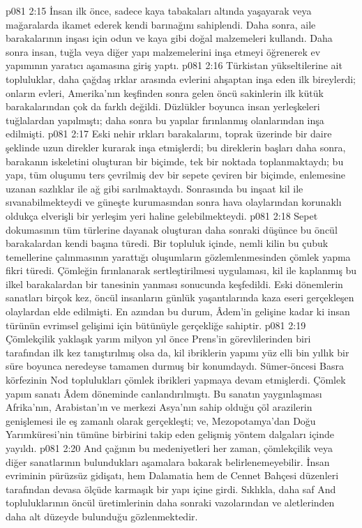 \vs p081 2:15 İnsan ilk önce, sadece kaya tabakaları altında yaşayarak veya mağaralarda ikamet ederek kendi barınağını sahiplendi. Daha sonra, aile barakalarının inşası için odun ve kaya gibi doğal malzemeleri kullandı. Daha sonra insan, tuğla veya diğer yapı malzemelerini inşa etmeyi öğrenerek ev yapımının yaratıcı aşamasına giriş yaptı.
\vs p081 2:16 Türkistan yükseltilerine ait topluluklar, daha çağdaş ırklar arasında evlerini ahşaptan inşa eden ilk bireylerdi; onların evleri, Amerika’nın keşfinden sonra gelen öncü sakinlerin ilk kütük barakalarından çok da farklı değildi. Düzlükler boyunca insan yerleşkeleri tuğlalardan yapılmıştı; daha sonra bu yapılar fırınlanmış olanlarından inşa edilmişti.
\vs p081 2:17 Eski nehir ırkları barakalarını, toprak üzerinde bir daire şeklinde uzun direkler kurarak inşa etmişlerdi; bu direklerin başları daha sonra, barakanın iskeletini oluşturan bir biçimde, tek bir noktada toplanmaktaydı; bu yapı, tüm oluşumu ters çevrilmiş dev bir sepete çeviren bir biçimde, enlemesine uzanan sazlıklar ile ağ gibi sarılmaktaydı. Sonrasında bu inşaat kil ile sıvanabilmekteydi ve güneşte kurumasından sonra hava olaylarından korunaklı oldukça elverişli bir yerleşim yeri haline gelebilmekteydi.
\vs p081 2:18 Sepet dokumasının tüm türlerine dayanak oluşturan daha sonraki düşünce bu öncül barakalardan kendi başına türedi. Bir topluluk içinde, nemli kilin bu çubuk temellerine çalınmasının yarattığı oluşumların gözlemlenmesinden çömlek yapma fikri türedi. Çömleğin fırınlanarak sertleştirilmesi uygulaması, kil ile kaplanmış bu ilkel barakalardan bir tanesinin yanması sonucunda keşfedildi. Eski dönemlerin sanatları birçok kez, öncül insanların günlük yaşantılarında kaza eseri gerçekleşen olaylardan elde edilmişti. En azından bu durum, Âdem’in gelişine kadar ki insan türünün evrimsel gelişimi için bütünüyle gerçekliğe sahiptir.
\vs p081 2:19 Çömlekçilik yaklaşık yarım milyon yıl önce Prens’in görevlilerinden biri tarafından ilk kez tanıştırılmış olsa da, kil ibriklerin yapımı yüz elli bin yıllık bir süre boyunca neredeyse tamamen durmuş bir konumdaydı. Sümer\hyp{}öncesi Basra körfezinin Nod toplulukları çömlek ibrikleri yapmaya devam etmişlerdi. Çömlek yapım sanatı Âdem döneminde canlandırılmıştı. Bu sanatın yaygınlaşması Afrika’nın, Arabistan’ın ve merkezi Asya’nın sahip olduğu çöl arazilerin genişlemesi ile eş zamanlı olarak gerçekleşti; ve, Mezopotamya’dan Doğu Yarımküresi’nin tümüne birbirini takip eden gelişmiş yöntem dalgaları içinde yayıldı.
\vs p081 2:20 And çağının bu medeniyetleri her zaman, çömlekçilik veya diğer sanatlarının bulundukları aşamalara bakarak belirlenemeyebilir. İnsan evriminin pürüzsüz gidişatı, hem Dalamatia hem de Cennet Bahçesi düzenleri tarafından devasa ölçüde karmaşık bir yapı içine girdi. Sıklıkla, daha saf And topluluklarının öncül üretimlerinin daha sonraki vazolarından ve aletlerinden daha alt düzeyde bulunduğu gözlenmektedir.
